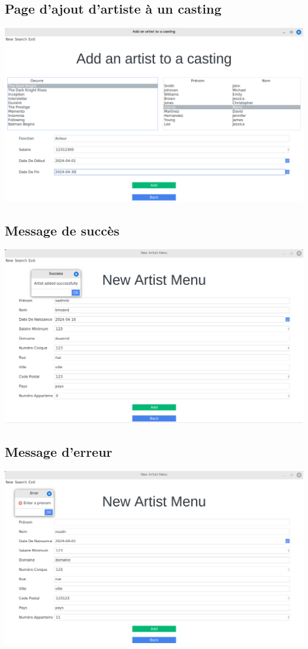 \documentclass{article}
\begin{document}
\subsection{Page d'ajout d'artiste à un casting}

\begin{center}
  \includegraphics[scale=0.16]{addcasting.png}
\end{center}

\subsection{Message de succès}

\begin{center}
  \includegraphics[scale=0.16]{success.png}
\end{center}

\subsection{Message d'erreur}

\begin{center}
   \includegraphics[scale=0.16]{error.png}
\end{center}





  
\end{document}
